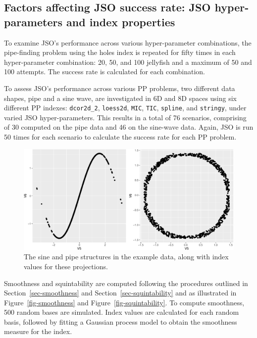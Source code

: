 \documentclass[
  12pt,
]{interact}
\theoremstyle{plain}
\begin{document}
\hypertarget{sec-app-2}{%
\subsection{Factors affecting JSO success rate: JSO hyper-parameters and
index properties}\label{sec-app-2}}

To examine JSO's performance across various hyper-parameter
combinations, the pipe-finding problem using the holes index is repeated
for fifty times in each hyper-parameter combination: 20, 50, and 100
jellyfish and a maximum of 50 and 100 attempts. The success rate is
calculated for each combination.

To assess JSO's performance across various PP problems, two different
data shapes, pipe and a sine wave, are investigated in 6D and 8D spaces
using six different PP indexes: \texttt{dcor2d\_2}, \texttt{loess2d},
\texttt{MIC}, \texttt{TIC}, \texttt{spline}, and \texttt{stringy}, under
varied JSO hyper-parameters. This results in a total of 76 scenarios,
comprising of 30 computed on the pipe data and 46 on the sine-wave data.
Again, JSO is run 50 times for each scenario to calculate the success
rate for each PP problem.

\begin{figure}

{\centering \includegraphics{jso_files/figure-pdf/fig-plot-data-1.pdf}

}

\caption{\label{fig-plot-data}The sine and pipe structures in the
example data, along with index values for these projections.}

\end{figure}

Smoothness and squintability are computed following the procedures
outlined in Section~\ref{sec-smoothness} and
Section~\ref{sec-squintability} and as illustrated in
Figure~\ref{fig-smoothness} and Figure~\ref{fig-squintability}. To
compute smoothness, 500 random bases are simulated. Index values are
calculated for each random basis, followed by fitting a Gaussian process
model to obtain the smoothness measure for the index.
\end{document}
